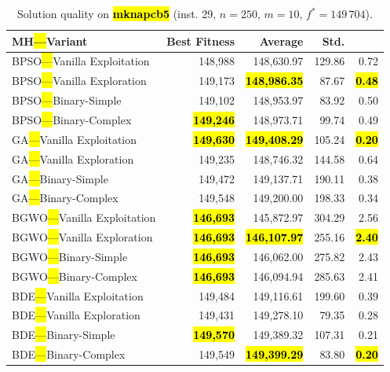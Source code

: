 \documentclass[mathematics,article,accept,moreauthors]{Definitions/mdpi}
\begin{document}
\begin{table}[H]
  \small
  \caption{Solution quality on \textbf{\hl{mknapcb5}} (inst. 29, $n=250$, $m=10$, $f^*=149\,704$).}
  \label{tab:calidad_mknapcb5_29}
  \begin{tabularx}{\textwidth}{lRRRR}
    \toprule
    \textbf{MH\hl{---}Variant} &
    \textbf{Best Fitness} &
    \textbf{Average} &
    \textbf{Std.} &
    \textbf{} \\
    \midrule
    BPSO\hl{---}Vanilla Exploitation &         148,988 &        148,630.97 & 129.86 &         0.72 \\
    BPSO\hl{---}Vanilla Exploration  &         149,173 & \textbf{\hl{148,986.35}} &  87.67 & \textbf{\hl{0.48}} \\
    BPSO\hl{---}Binary-Simple        &         149,102 &        148,953.97 &  83.92 &         0.50 \\
    BPSO\hl{---}Binary-Complex       & \textbf{\hl{149,246}} &        148,973.71 &  99.74 &         0.49 \\
    \midrule
    GA\hl{---}Vanilla Exploitation   & \textbf{\hl{149,630}} & \textbf{\hl{149,408.29}} & 105.24 & \textbf{\hl{0.20}} \\
    GA\hl{---}Vanilla Exploration    &         149,235 &        148,746.32 & 144.58 &         0.64 \\
    GA\hl{---}Binary-Simple          &         149,472 &        149,137.71 & 190.11 &         0.38 \\
    GA\hl{---}Binary-Complex         &         149,548 &        149,200.00 & 198.33 &         0.34 \\
    \midrule
    BGWO\hl{---}Vanilla Exploitation & \textbf{\hl{146,693}} &        145,872.97 & 304.29 &         2.56 \\
    BGWO\hl{---}Vanilla Exploration  & \textbf{\hl{146,693}} & \textbf{\hl{146,107.97}} & 255.16 & \textbf{\hl{2.40}} \\
    BGWO\hl{---}Binary-Simple        & \textbf{\hl{146,693}} &        146,062.00 & 275.82 &         2.43 \\
    BGWO\hl{---}Binary-Complex       & \textbf{\hl{146,693}} &        146,094.94 & 285.63 &         2.41 \\
    \midrule
    BDE\hl{---}Vanilla Exploitation  &         149,484 &        149,116.61 & 199.60 &         0.39 \\
    BDE\hl{---}Vanilla Exploration   &         149,431 &        149,278.10 &  79.35 &         0.28 \\
    BDE\hl{---}Binary-Simple         & \textbf{\hl{149,570}} &        149,389.32 & 107.31 &         0.21 \\
    BDE\hl{---}Binary-Complex        &         149,549 & \textbf{\hl{149,399.29}} &  83.80 & \textbf{\hl{0.20}} \\
    \bottomrule
  \end{tabularx}
\end{table}
\end{document}
